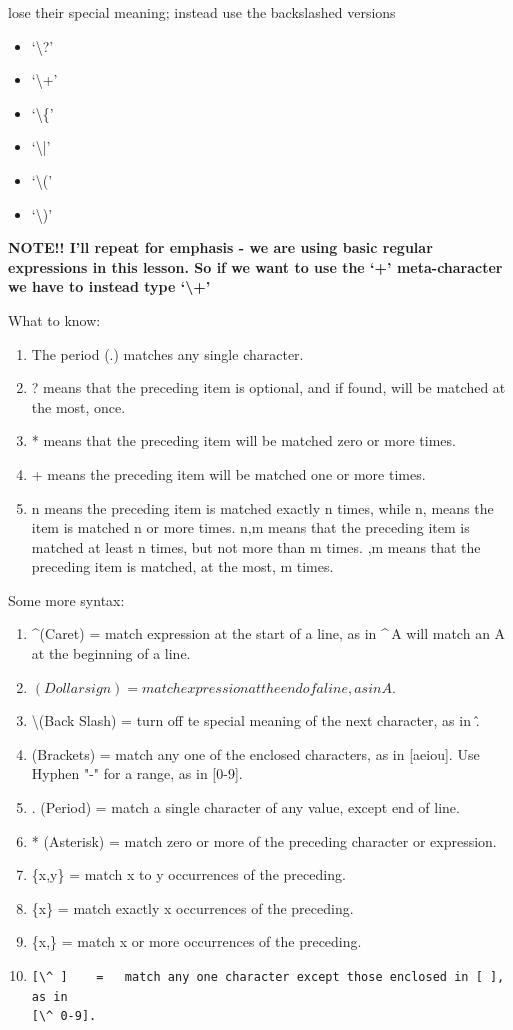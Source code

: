 \documentclass[10pt]{article}
\begin{document}
 lose their special meaning; instead use the backslashed versions

\begin{itemize}
\item `\textbackslash?'
\item `\textbackslash+'
\item `\textbackslash\{'
\item `\textbackslash|'
\item `\textbackslash('
\item `\textbackslash)'
\end{itemize}

{\LARGE\textbf{NOTE!! I'll repeat for emphasis - we are using basic regular
expressions in this lesson. So if we want to use the `+' meta-character we have
to instead type `\textbackslash+'}}

What to know:
\begin{enumerate}
\item The period (.) matches any single character.
\item ? means that the preceding item is optional, and if found, will be matched at the most, once.
\item * means that the preceding item will be matched zero or more times.
\item + means the preceding item will be matched one or more times.
\item {n} means the preceding item is matched exactly n times, while {n,} means the item is matched n or more times. {n,m} means that the preceding item is matched at least n times, but not more than m times. {,m} means that the preceding item is matched, at the most, m times.
\end{enumerate}

Some more syntax:
\begin{enumerate}
\item \textasciicircum (Caret)   =   match expression at the start of a line, as
in \textasciicircum\,A will match an A at the beginning of a line.
\item $ (Dollar sign)    =   match expression at the end of a line, as in A$.
\item \textbackslash (Back Slash)  =   turn off te special meaning of the next character, as in \^.
\item [ ] (Brackets)  =   match any one of the enclosed characters, as in [aeiou]. Use Hyphen "-" for a range, as in [0-9].
\item . (Period)  =   match a single character of any value, except end of line.
\item * (Asterisk)    =   match zero or more of the preceding character or expression.
\item \{x,y\} =   match x to y occurrences of the preceding.
\item \{x\}   =   match exactly x occurrences of the preceding.
\item  \{x,\}  =   match x or more occurrences of the preceding.
\item \begin{verbatim}[\^ ]    =   match any one character except those enclosed in [ ], as in
[\^ 0-9].\end{verbatim}
\end{enumerate}
\end{document}
